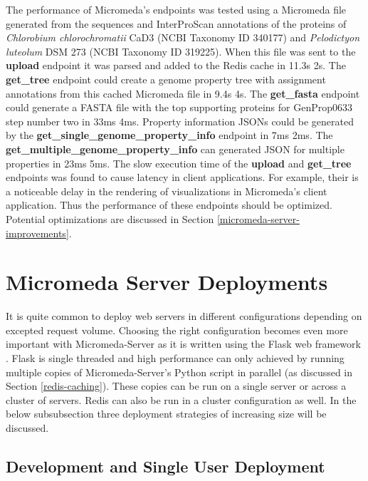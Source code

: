 The performance of Micromeda's endpoints was tested using a Micromeda file generated from the sequences and InterProScan annotations of the proteins of \textit{Chlorobium chlorochromatii} CaD3 (NCBI Taxonomy ID 340177) and \textit{Pelodictyon luteolum} DSM 273 (NCBI Taxonomy ID 319225). When this file was sent to the \textbf{upload} endpoint it was parsed and added to the Redis cache in 11.3s \textpm 2s. The \textbf{get\_tree} endpoint could create a genome property tree with assignment annotations from this cached Micromeda file in 9.4s \textpm 4s. The \textbf{get\_fasta} endpoint could generate a FASTA file with the top supporting proteins for GenProp0633 step number two in 33ms \textpm 4ms. Property information JSONs could be generated by the \textbf{get\_single\_genome\_property\_info} endpoint in 7ms \textpm 2ms. The \textbf{get\_multiple\_genome\_property\_info} can generated JSON for multiple properties in 23ms \textpm 5ms. The slow execution time of the \textbf{upload} and \textbf{get\_tree} endpoints was found to cause latency in client applications. For example, their is a noticeable delay in the rendering of visualizations in Micromeda's client application. Thus the performance of these endpoints should be optimized. Potential optimizations are discussed in Section \ref{micromeda-server-improvements}.

\section{Micromeda Server Deployments}

It is quite common to deploy web servers in different configurations depending on excepted request volume. Choosing the right configuration becomes even more important with Micromeda-Server as it is written using the Flask web framework \cite{grinberg2018flask}. Flask is single threaded and high performance can only achieved by running multiple copies of Micromeda-Server's Python script in parallel (as discussed in Section \ref{redis-caching}). These copies can be run on a single server or across a cluster of servers. Redis can also be run in a cluster configuration as well. In the below subsubsection three deployment strategies of increasing size will be discussed. 

\subsection{Development and Single User Deployment}

